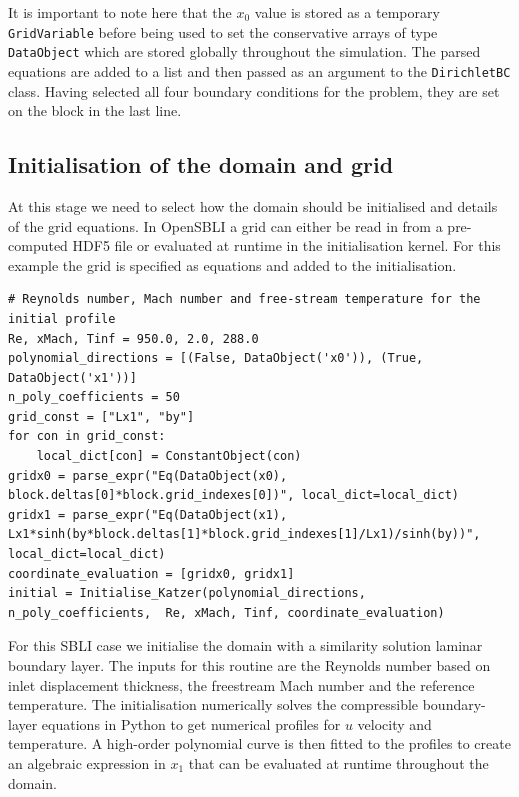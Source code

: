 \documentclass[11pt]{article}
\begin{document}
It is important to note here that the $x_0$ value is stored as a temporary \verb|GridVariable| before being used to set the conservative arrays of type \verb|DataObject| which are stored globally throughout the simulation. The parsed equations are added to a list and then passed as an argument to the \verb|DirichletBC| class. Having selected all four boundary conditions for the problem, they are set on the block in the last line. 



\subsection{Initialisation of the domain and grid}
At this stage we need to select how the domain should be initialised and details of the grid equations. In OpenSBLI a grid can either be read in from a pre-computed HDF5 file or evaluated at runtime in the initialisation kernel. For this example the grid is specified as equations and added to the initialisation. 
\begin{lstlisting}
# Reynolds number, Mach number and free-stream temperature for the initial profile
Re, xMach, Tinf = 950.0, 2.0, 288.0
polynomial_directions = [(False, DataObject('x0')), (True, DataObject('x1'))]
n_poly_coefficients = 50
grid_const = ["Lx1", "by"]
for con in grid_const:
    local_dict[con] = ConstantObject(con)
gridx0 = parse_expr("Eq(DataObject(x0), block.deltas[0]*block.grid_indexes[0])", local_dict=local_dict)
gridx1 = parse_expr("Eq(DataObject(x1), Lx1*sinh(by*block.deltas[1]*block.grid_indexes[1]/Lx1)/sinh(by))", local_dict=local_dict)
coordinate_evaluation = [gridx0, gridx1]
initial = Initialise_Katzer(polynomial_directions, n_poly_coefficients,  Re, xMach, Tinf, coordinate_evaluation)
\end{lstlisting}
For this SBLI case we initialise the domain with a similarity solution laminar boundary layer. The inputs for this routine are the Reynolds number based on inlet displacement thickness, the freestream Mach number and the reference temperature. The initialisation numerically solves the compressible boundary-layer equations in Python to get numerical profiles for $u$ velocity and temperature. A high-order polynomial curve is then fitted to the profiles to create an algebraic expression in $x_1$ that can be evaluated at runtime throughout the domain.
\end{document}
